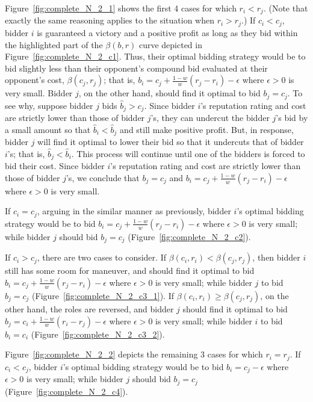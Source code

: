 Figure~\ref{fig:complete_N_2_1} shows the first 4 cases for which $r_i < r_j$. (Note that exactly the same reasoning applies to the situation when $r_i > r_j$.) If $c_i < c_j$, bidder $i$ is guaranteed a victory and a positive profit as long as they bid within the highlighted part of the $\beta(b,r)$ curve depicted in Figure~\ref{fig:complete_N_2_c1}. Thus, their optimal bidding strategy would be to bid slightly less than their opponent's compound bid evaluated at their opponent's cost, $\beta(c_j,r_j)$; that is, $b_i = c_j + \frac{1-w}{w}(r_j-r_i) - \epsilon$ where $\epsilon>0$ is very small. Bidder $j$, on the other hand, should find it optimal to bid $b_j = c_j$. To see why, suppose bidder $j$ bids $\hat{b}_j>c_j$. Since bidder $i$'s reputation rating and cost are strictly lower than those of bidder $j$'s, they can undercut the bidder $j$'s bid by a small amount so that $\hat{b}_i < \hat{b}_j$ and still make positive profit. But, in response, bidder $j$ will find it optimal to lower their bid so that it undercuts that of bidder $i$'s; that is, $\hat{b}_j < \hat{b}_i$. This process will continue until one of the bidders is forced to bid their cost. Since bidder $i$'s reputation rating and cost are strictly lower than those of bidder $j$'s, we conclude that $b_j = c_j$ and $b_i = c_j + \frac{1-w}{w}(r_j-r_i) - \epsilon$ where $\epsilon>0$ is very small.

If $c_i = c_j$, arguing in the similar manner as previously, bidder $i$'s optimal bidding strategy would be to bid $b_i = c_j + \frac{1-w}{w}(r_j-r_i) - \epsilon$ where $\epsilon>0$ is very small; while bidder $j$ should bid $b_j = c_j$ (Figure~\ref{fig:complete_N_2_c2}).

If $c_i > c_j$, there are two cases to consider. If $\beta(c_i,r_i)<\beta(c_j,r_j)$, then bidder $i$ still has some room for maneuver, and should find it optimal to bid $b_i = c_j + \frac{1-w}{w}(r_j-r_i) - \epsilon$ where $\epsilon>0$ is very small; while bidder $j$ to bid $b_j=c_j$ (Figure~\ref{fig:complete_N_2_c3_1}). If $\beta(c_i,r_i)\ge \beta(c_j,r_j)$, on the other hand, the roles are reversed, and bidder $j$ should find it optimal to bid $b_j = c_i + \frac{1-w}{w}(r_i-r_j) - \epsilon$ where $\epsilon>0$ is very small; while bidder $i$ to bid $b_i = c_i$ (Figure~\ref{fig:complete_N_2_c3_2}).

Figure~\ref{fig:complete_N_2_2} depicts the remaining 3 cases for which $r_i=r_j$. If $c_i < c_j$, bidder $i$'s optimal bidding strategy would be to bid $b_i = c_j - \epsilon$ where $\epsilon>0$ is very small; while bidder $j$ should bid $b_j = c_j$ (Figure~\ref{fig:complete_N_2_c4}).

